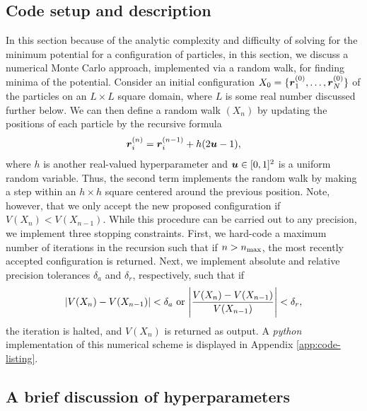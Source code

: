 \subsection{Code setup and description}
\label{ssec:code-setup-and-description}

In this section because of the analytic complexity and difficulty of solving for the minimum potential for a configuration of particles, in this section, we discuss a numerical Monte Carlo approach, implemented via a random walk, for finding minima of the potential.
Consider an initial configuration $X_0 = \{ \vb*{r}_{1}^{(0)}, \ldots, \vb*{r}_{N}^{(0)} \}$ of the particles on an $L \times L$ square domain, where $L$ is some real number discussed further below.
We can then define a random walk $(X_{n})$ by updating the positions of each particle by the recursive formula
\begin{align}
    \vb*{r}_{i}^{(n)} = \vb*{r}_{i}^{(n-1)} + h ( 2 \vb*{u} - 1 )
,\end{align}
where $h$ is another real-valued hyperparameter and $\vb*{u} \in [0,1]^{2}$ is a uniform random variable.
Thus, the second term implements the random walk by making a step within an $h \times h$ square centered around the previous position.
Note, however, that we only accept the new proposed configuration if $V(X_{n}) < V(X_{n-1})$.
While this procedure can be carried out to any precision, we implement three stopping constraints.
First, we hard-code a maximum number of iterations in the recursion such that if $n > n_{\rm max}$, the most recently accepted configuration is returned.
Next, we implement absolute and relative precision tolerances $\delta_{a}$ and $\delta_{r}$, respectively, such that if
\begin{align}
    |V(X_{n}) - V(X_{n-1})| < \delta_{a} ~ {\rm or} ~ \Bigg| \frac{V(X_{n}) - V(X_{n-1})}{V(X_{n-1})} \Bigg| < \delta_{r}
,\end{align}
the iteration is halted, and $V(X_{n})$ is returned as output.
A \textit{python} implementation of this numerical scheme is displayed in Appendix \ref{app:code-listing}.

\subsection{A brief discussion of hyperparameters}

